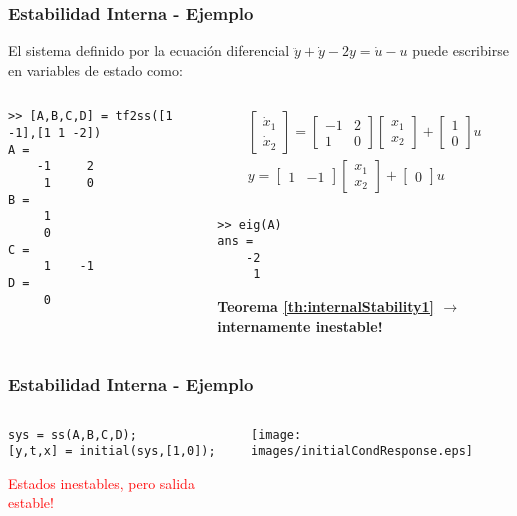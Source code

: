 \documentclass[aspectratio=169]{beamer}
\theoremstyle{definition}
\theoremstyle{plain}
\theoremstyle{remark}
\begin{document}
\begin{frame}[<+->][fragile]\frametitle{Estabilidad Interna - Ejemplo}
El sistema definido por la ecuación diferencial $\ddot{y} + \dot{y} - 2y = \dot{u} - u$ puede escribirse en variables de estado como:
\begin{columns}
\begin{column}{0.5\textwidth}
\scriptsize
\begin{verbatim}
>> [A,B,C,D] = tf2ss([1 -1],[1 1 -2])
A =
    -1     2
     1     0
B =
     1
     0
C =
     1    -1
D =
     0
\end{verbatim} 
\end{column}	
\begin{column}{0.5\textwidth}
\begin{align*}
\begin{bmatrix}
	\dot{x}_1 \\ \dot{x}_2
\end{bmatrix} = 
\begin{bmatrix}
	-1 & 2 \\ 1 & 0
\end{bmatrix}
\begin{bmatrix}
	x_1 \\ x_2
\end{bmatrix} + 
\begin{bmatrix}
	1 \\ 0
\end{bmatrix}u\\
y =
\begin{bmatrix}
	1 & -1
\end{bmatrix}
\begin{bmatrix}
	x_1 \\ x_2
\end{bmatrix} + 
\begin{bmatrix}
	0
\end{bmatrix}u\\
\end{align*}
\vspace*{-1.5cm}
\small
\begin{verbatim}
>> eig(A)
ans =
    -2
     1	
\end{verbatim}
\textbf{Teorema \ref{th:internalStability1} $\rightarrow$ internamente inestable!}
\end{column}	
\end{columns}
\end{frame}

\begin{frame}[<+->][fragile]\frametitle{Estabilidad Interna - Ejemplo}
\vspace*{5mm}
\begin{columns}
\begin{column}{0.4\textwidth}
\small
\begin{verbatim}
sys = ss(A,B,C,D);
[y,t,x] = initial(sys,[1,0]);
\end{verbatim}
\textcolor{red}{Estados inestables, pero salida estable!} 
\end{column}	
\begin{column}{0.6\textwidth}
\centering
\texttt{[image: images/initialCondResponse.eps]}
\end{column}	
\end{columns}
\end{frame}
\end{document}
